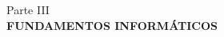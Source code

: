 \newpage
\thispagestyle{empty}
\vspace*{\fill}
\begin{center}
    \large Parte III \\
    \vspace{0.5cm}           
    \LARGE \textbf{FUNDAMENTOS INFORMÁTICOS}
\end{center}
\vspace*{\fill}
\newpage
\setcounter{page}{1}  